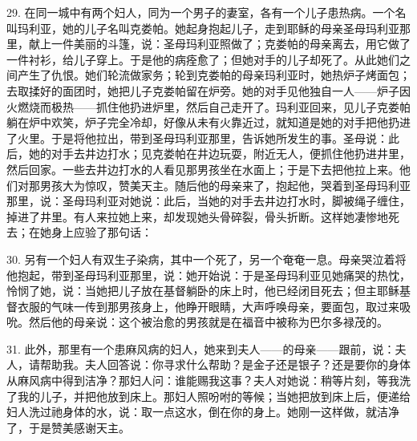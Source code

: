 29. 在同一城中有两个妇人，同为一个男子的妻室，各有一个儿子患热病。一个名叫玛利亚，她的儿子名叫克娄帕。她起身抱起儿子，走到耶稣的母亲圣母玛利亚那里，献上一件美丽的斗篷，说：圣母玛利亚照做了；克娄帕的母亲离去，用它做了一件衬衫，给儿子穿上。于是他的病痊愈了；但她对手的儿子却死了。从此她们之间产生了仇恨。她们轮流做家务；轮到克娄帕的母亲玛利亚时，她热炉子烤面包；去取揉好的面团时，她把儿子克娄帕留在炉旁。她的对手见他独自一人——炉子因火燃烧而极热——抓住他扔进炉里，然后自己走开了。玛利亚回来，见儿子克娄帕躺在炉中欢笑，炉子完全冷却，好像从未有火靠近过，就知道是她的对手把他扔进了火里。于是将他拉出，带到圣母玛利亚那里，告诉她所发生的事。圣母说：此后，她的对手去井边打水；见克娄帕在井边玩耍，附近无人，便抓住他扔进井里，然后回家。一些去井边打水的人看见那男孩坐在水面上；于是下去把他拉上来。他们对那男孩大为惊叹，赞美天主。随后他的母亲来了，抱起他，哭着到圣母玛利亚那里，说：圣母玛利亚对她说：此后，当她的对手去井边打水时，脚被绳子缠住，掉进了井里。有人来拉她上来，却发现她头骨碎裂，骨头折断。这样她凄惨地死去；在她身上应验了那句话：\par

30. 另有一个妇人有双生子染病，其中一个死了，另一个奄奄一息。母亲哭泣着将他抱起，带到圣母玛利亚那里，说：她开始说：于是圣母玛利亚见她痛哭的热忱，怜悯了她，说：当她把儿子放在基督躺卧的床上时，他已经闭目死去；但主耶稣基督衣服的气味一传到那男孩身上，他睁开眼睛，大声呼唤母亲，要面包，取过来吸吮。然后他的母亲说：这个被治愈的男孩就是在福音中被称为巴尔多禄茂的。\par

31. 此外，那里有一个患麻风病的妇人，她来到夫人——的母亲——跟前，说：夫人，请帮助我。夫人回答说：你寻求什么帮助？是金子还是银子？还是要你的身体从麻风病中得到洁净？那妇人问：谁能赐我这事？夫人对她说：稍等片刻，等我洗了我的儿子，并把他放到床上。那妇人照吩咐的等候；当她把放到床上后，便递给妇人洗过祂身体的水，说：取一点这水，倒在你的身上。她刚一这样做，就洁净了，于是赞美感谢天主。\par

